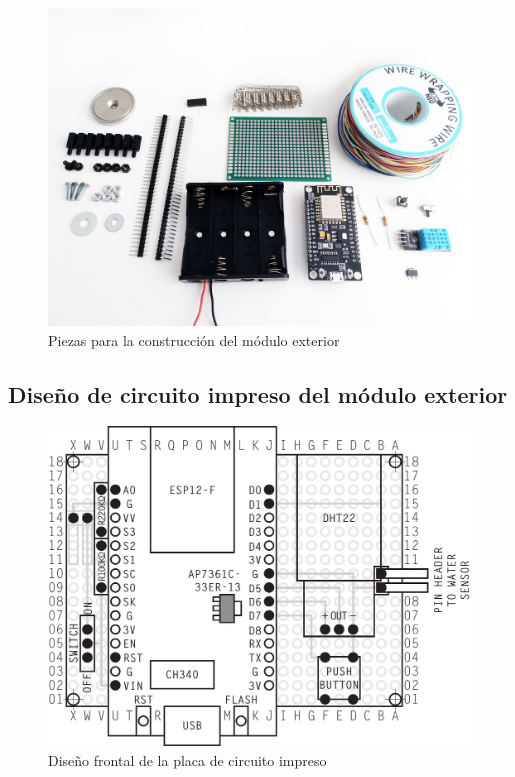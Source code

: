 \begin{figure}
  \centering
  \includegraphics[width=0.98\columnwidth]{../photos/exterior-pieces}
  \caption{Piezas para la construcción del módulo exterior}
  \label{fig:exterior-pieces}
\end{figure}

\clearpage

\subsection{Diseño de circuito impreso del módulo exterior}

\vfill

\begin{figure}[H]
  \centering
  \includegraphics[width=1\columnwidth]{../design/exterior-board-front}
  \caption{Diseño frontal de la placa de circuito impreso}
  \label{fig:exterior-board-front}
\end{figure}

